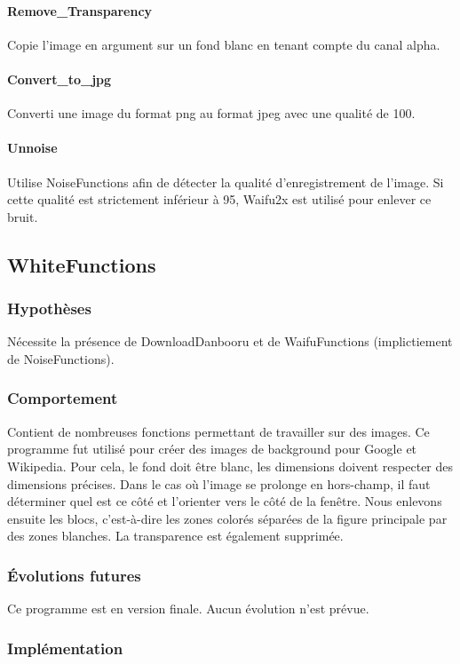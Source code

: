 \documentclass[a4paper,12pt]{article}
\begin{document}
\paragraph{Remove\_Transparency}
Copie l'image en argument sur un fond blanc en tenant compte du canal alpha. 
\paragraph{Convert\_to\_jpg}
Converti une image du format png au format jpeg avec une qualité de 100.
\paragraph{Unnoise}
Utilise NoiseFunctions afin de détecter la qualité d'enregistrement de l'image. Si cette qualité est strictement inférieur à 95, Waifu2x est utilisé pour enlever ce bruit.
\subsection{WhiteFunctions}
\subsubsection{Hypothèses}
Nécessite la présence de DownloadDanbooru et de WaifuFunctions (implictiement de NoiseFunctions).
\subsubsection{Comportement}
Contient de nombreuses fonctions permettant de travailler sur des images. Ce programme fut utilisé pour créer des images de background pour Google et Wikipedia. Pour cela, le fond doit être blanc, les dimensions doivent respecter des dimensions précises. Dans le cas où l'image se prolonge en hors-champ, il faut déterminer quel est ce côté et l'orienter vers le côté de la fenêtre. Nous enlevons ensuite les blocs, c'est-à-dire les zones colorés séparées de la figure principale par des zones blanches. La transparence est également supprimée.
\subsubsection{Évolutions futures}
Ce programme est en version finale. Aucun évolution n'est prévue.
\subsubsection{Implémentation}
\end{document}
